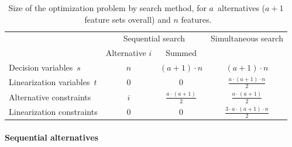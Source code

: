 \documentclass{article}
\theoremstyle{definition}
\begin{document}
\begin{table}[t]
	\centering
	\renewcommand*{\arraystretch}{1.3}
	\begin{tabular}{lccc}
		\toprule
		& \multicolumn{2}{c}{Sequential search} & Simultaneous search \\
		\cmidrule(r){2-3}
		& Alternative $i$ & Summed & \\
		\midrule
		Decision variables~$s$ & $n$ & $ (a+1) \cdot n$ & $(a+1) \cdot n$ \\
		Linearization variables~$t$ & $0$ & $0$ & $\frac{a \cdot (a+1) \cdot n}{2}$ \\
		Alternative constraints & $i$ & $\frac{a \cdot (a+1)}{2}$ & $\frac{a \cdot (a+1)}{2}$ \\
		Linearization constraints & $0$ & $0$ & $\frac{3 \cdot a \cdot (a+1) \cdot n}{2}$ \\
		\bottomrule
	\end{tabular}
	\caption{Size of the optimization problem by search method, for $a$~alternatives ($a + 1$~feature sets overall) and $n$ features.}
	\label{tab:afs:seq-sim-comparison}
\end{table}

\paragraph{Sequential alternatives}
\end{document}
